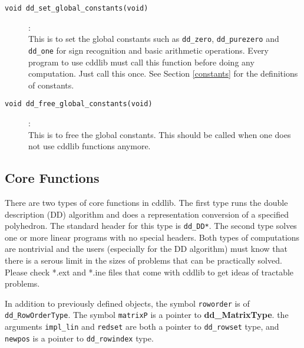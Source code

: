 \documentclass[11pt]{article}
\newcommand {\0} {{\bf 0}}
\begin{document}
\begin{description}

\item[{\tt void dd\_set\_global\_constants(void)}]:\\
This is to set the global constants such as {\tt dd\_zero},
{\tt dd\_purezero} and
{\tt dd\_one} for sign recognition and basic arithmetic
operations.  {Every program to use cddlib must call this function}
before doing any computation.    Just call this once.
 See Section \ref{constants} for the definitions of
constants.

\item[{\tt void dd\_free\_global\_constants(void)}]:\\
This is to free the global constants. This should be called
when one does not use cddlib functions anymore.
\end{description}

\subsection{Core Functions}  \label{CoreLibrary}

There are two types of core functions in cddlib.  The first type
runs the double description (DD) algorithm and does a representation
conversion of a specified polyhedron.  The standard header
for this type is {\tt dd\_DD*}.  The second type solves
one or more linear programs with no special headers.   
Both types of computations are nontrivial
and the users (especially for the DD algorithm) must
know that there is a serous limit in the sizes of problems
that can be practically solved. 
Please check *.ext and *.ine files that come with cddlib to get
ideas of tractable problems. 

In addition to previously defined objects, the symbol  {\tt roworder} is
of {\tt dd\_RowOrderType}. The symbol {\tt matrixP} is 
a pointer to {\bf dd\_MatrixType}.
the arguments {\tt impl\_lin} and {\tt redset} are both a pointer 
to {\tt dd\_rowset} type, and {\tt newpos} is a pointer to 
{\tt dd\_rowindex} type. 
\end{document}
